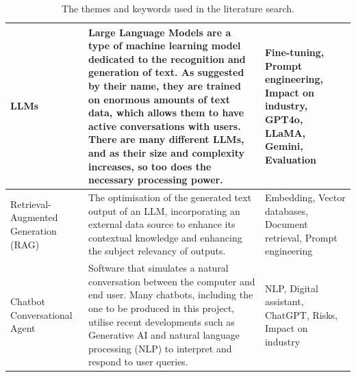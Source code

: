 \documentclass[12pt]{report}
\begin{document}
\begin{table}[H]
\begin{tabular}{|p{}|p{} | p{}|}
            \\

            \hline
            
            LLMs & Large Language Models are a type of machine learning model dedicated to the recognition and generation of text.
            As suggested by their name, they are trained on enormous amounts of text data, which allows them 
            to have active conversations with users. There are many different LLMs, and as their size and 
            complexity increases, so too does the necessary processing power. &
            Fine-tuning, Prompt engineering, Impact on industry,
            GPT4o, LLaMA, Gemini, Evaluation
            
            \\
            \hline 

            Retrieval-Augmented Generation \newline (RAG) & The optimisation of the generated text output of an LLM, incorporating
            an external data source to enhance its contextual knowledge and enhancing the subject relevancy of outputs.
            & Embedding, Vector databases, Document retrieval, Prompt engineering\\

            \hline
            Chatbot \newline Conversational Agent & Software that simulates a natural conversation between the 
            computer and end user. Many chatbots, including the one to be produced in this project, utilise recent
            developments such as Generative AI and natural language processing (NLP) to interpret and respond to user queries.
            \autocite{IBMChatbotDef}
            & NLP, Digital assistant, ChatGPT, Risks, Impact on industry \\




            \hline 

        \end{tabular}
        \caption{The themes and keywords used in the literature search.}
        \label{tab:themes}
    \end{table}
\end{document}
